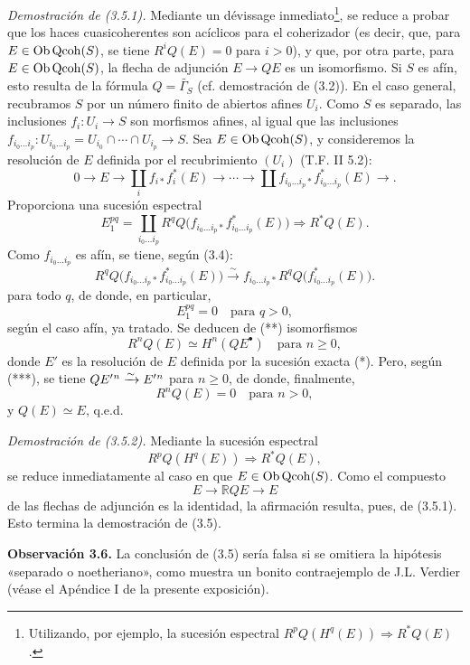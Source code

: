 \emph{Demostración de (3.5.1).} Mediante un dévissage inmediato\footnote{Utilizando, por ejemplo, la sucesión espectral $R^pQ(H^q(E))\Longrightarrow R^{*}Q(E)$.}, se reduce a probar que los haces cuasicoherentes son acíclicos para el coherizador (es decir, que, para $E\in\Ob\Qcoh(S)$, se tiene $R^iQ(E)=0$ para $i>0$), y que, por otra parte, para $E\in\Ob\Qcoh(S)$, la flecha de adjunción $E\longrightarrow QE$ es un isomorfismo. Si $S$ es afín, esto resulta de la fórmula $Q=\widetilde{\Gamma_S}$ (cf. demostración de (3.2)). En el caso general, recubramos $S$ por un número finito de abiertos afines $U_i$. Como $S$ es separado, las inclusiones $f_i:U_i\longrightarrow S$ son morfismos afines, al igual que las inclusiones $f_{i_0\ldots i_p}:U_{i_0\ldots i_p}=U_{i_0}\cap\cdots\cap U_{i_p}\longrightarrow S$. Sea $E\in\Ob\Qcoh(S)$, y consideremos la resolución de $E$ definida por el recubrimiento $(U_i)$ (T.F. II 5.2):
\begin{equation}\tag{*}
 0\longrightarrow E\longrightarrow \coprod_i f_{i*}f_i^*(E)\longrightarrow\cdots\longrightarrow
 \coprod f_{i_0\ldots i_p*}f_{i_0\ldots i_p}^*(E)\longrightarrow .
\end{equation}
Proporciona una sucesión espectral
\begin{equation}\tag{**}
 E_1^{pq}=\coprod_{i_0\ldots i_p}R^qQ\bigl(f_{i_0\ldots i_p*}f_{i_0\ldots i_p}^*(E)\bigr)
 \Longrightarrow R^{*}Q(E).
\end{equation}
Como $f_{i_0\ldots i_p}$ es afín, se tiene, según (3.4):
\begin{equation}\tag{***}
 R^qQ\bigl(f_{i_0\ldots i_p*}f_{i_0\ldots i_p}^*(E)\bigr)
 \xrightarrow{\sim} f_{i_0\ldots i_p*}R^qQ\bigl(f_{i_0\ldots i_p}^*(E)\bigr).
\end{equation}
para todo $q$, de donde, en particular,
\[
 E_1^{pq}=0\quad\text{para }q>0,
\]
según el caso afín, ya tratado. Se deducen de (**) isomorfismos
\[
 R^nQ(E)\simeq H^n(QE^\bullet)\quad\text{para }n\geq0,
\]
donde $E'$ es la resolución de $E$ definida por la sucesión exacta (*). Pero, según (***), se tiene $Q\sisi{E^n}{E'{}^n}\xrightarrow{\sim} \sisi{E^n}{E'{}^n}$ para $n\geq0$, de donde, finalmente,
\[
 R^nQ(E)=0\quad\text{para }n>0,
\]
y $Q(E)\simeq E$, q.e.d.

\emph{Demostración de (3.5.2).} Mediante la sucesión espectral
\[
 R^pQ(H^q(E))\Longrightarrow R^{*}Q(E),
\]
se reduce inmediatamente al caso en que $E\in\Ob\Qcoh(S)$. Como el compuesto
\[
 E\longrightarrow \mathbb RQE\longrightarrow E
\]
de las flechas de adjunción es la identidad, la afirmación resulta, pues, de (3.5.1). Esto termina la demostración de (3.5).

\textbf{Observación 3.6.} La conclusión de (3.5) sería falsa si se omitiera la hipótesis «separado o noetheriano», como muestra un bonito contraejemplo de J.L. Verdier (véase el Apéndice I de la presente exposición).

